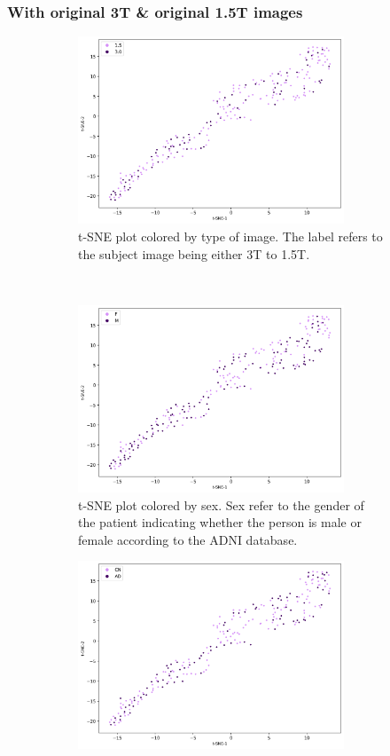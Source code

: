 \documentclass[12pt, fleqn, titlepage]{article}
\newcommand{\1}[1]{\mathds{1}\left[#1\right]}
\begin{document}
\subsubsection{With original 3T \& original 1.5T images }

\begin{figure}[H]
	\centering
	\begin{subfigure}[t]{0.59\textwidth}
		\centering
		\includegraphics[height=2.2in]{imgs/classifier/not_generated_imgs_tsne_type}%
		\caption{t-SNE plot colored by type of image. The label refers to the subject image being either 3T to 1.5T.}
	\end{subfigure}%
	~
	\begin{subfigure}[t]{0.5\textwidth}
		\centering
		\includegraphics[height=2.2in]{imgs/classifier/not_generated_imgs_tsne_sex}%
		\caption{t-SNE plot colored by sex. Sex refer to the gender of the patient indicating whether the person is male or female according to the ADNI database.}	
	\end{subfigure}
	\begin{subfigure}[t]{0.5\textwidth}
		\centering
		\includegraphics[height=2.2in]{imgs/classifier/not_generated_imgs_tsne_group}%

\end{subfigure}
\end{figure}
\end{document}
